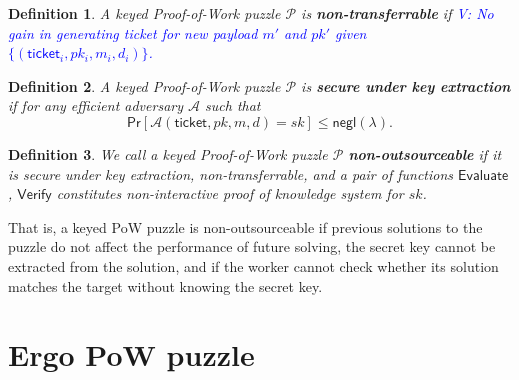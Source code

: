 \documentclass[]{article}
\newcommand{\vk}[1]{\textcolor{blue}{V: {#1}}}
\newcommand{\Ticket}{\mathsf{ticket}}
\newcommand{\Eval}{\mathsf{Evaluate}}
\newcommand{\Verify}{\mathsf{Verify}}
\newtheorem{definition}{Definition}
\begin{document}
    \begin{definition}
        A keyed Proof-of-Work puzzle $\mathcal{P}$ is {\bf non-transferrable} if
        \vk{No gain in generating ticket for new payload $m'$ and $pk'$ given
        $\{(\Ticket_i, pk_i, m_i, d_i)\}$.}
    \end{definition}

    \begin{definition}
        A keyed Proof-of-Work puzzle $\mathcal{P}$ is {\bf secure under key
        extraction} if for any efficient adversary $\mathcal{A}$ such that
        \begin{equation}
            \mathsf{Pr}[\mathcal{A}(\Ticket,pk,m,d)=sk]\le\mathsf{negl}(\lambda).
        \end{equation}
    \end{definition}

    \begin{definition}
        We call a keyed Proof-of-Work puzzle $\mathcal{P}$ {\bf
        non-outsourceable} if it is secure under key extraction,
        non-transferrable, and a pair of functions $\Eval$, $\Verify$
        constitutes non-interactive proof of knowledge system for $sk$.
    \end{definition}

    That is, a keyed PoW puzzle is non-outsourceable if previous solutions to
    the puzzle do not affect the performance of future solving, the secret key
    cannot be extracted from the solution, and if the worker cannot check
    whether its solution matches the target without knowing the secret key.

    \section{Ergo PoW puzzle}
    \label{puzzle}
\end{document}
